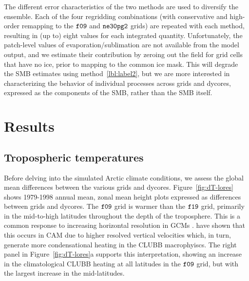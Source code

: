 \documentclass[draft]{agujournal2019}
\begin{document}
The different error characteristics of the two methods are used to {\color{blue}{further}} diversify the ensemble. Each of the four regridding combinations (with conservative and high-order remapping to the $\tt f09$ and $\tt ne30pg2$ grids) are repeated with each method, resulting in (up to) eight values for each integrated quantity. Unfortunately, the patch-level values of evaporation/sublimation are not available from the model output, and we estimate their contribution by zeroing out the field for grid cells that have no ice, prior to mapping to the common ice mask. This will degrade the SMB estimates using method~\ref{lbl:label2}, but we are more interested in characterizing the behavior of individual processes across grids and dycores, expressed as the components of the SMB, rather than the SMB itself.

\section{Results}\label{sec:results}

\subsection{Tropospheric temperatures}

Before delving into the simulated Arctic climate conditions, we assess the global mean differences between the various grids and dycores. Figure~\ref{fig:dT-lores} shows 1979-1998 annual mean, zonal mean height plots expressed as differences between {} grids and dycores. The $\tt f09$ grid is warmer than the $\tt f19$ grid, primarily in the mid-to-high latitudes throughout the depth of the troposphere. This is a common response to increasing horizontal resolution in GCMs \cite{PS2002CD,RETAL2006JC}.
 have shown that this occurs in CAM due to higher resolved vertical velocities which, in turn, generate more condensational heating in the CLUBB macrophyiscs. The right panel in Figure~\ref{fig:dT-lores}a supports this interpretation, showing an increase in the climatological CLUBB heating at all latitudes in the $\tt f09$ grid, but with the largest increase in the mid-latitudes. 
\end{document}
